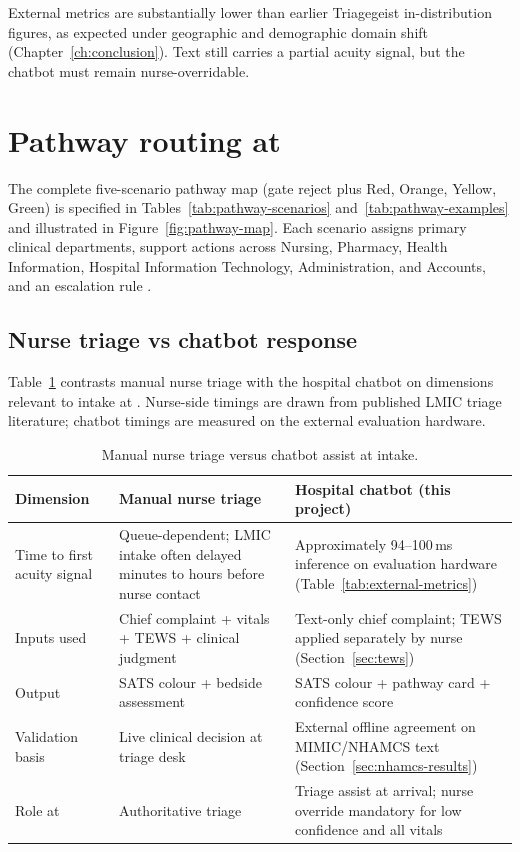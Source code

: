 \begin{remark}
External metrics are substantially lower than earlier Triagegeist in-distribution figures, as expected under geographic and demographic domain shift (Chapter~\ref{ch:conclusion}). Text still carries a partial acuity signal, but the chatbot must remain nurse-overridable.
\end{remark}

\section{Pathway routing at \examplehospital{}}
\label{sec:pathway-results}

The complete five-scenario pathway map (gate reject plus Red, Orange, Yellow, Green) is specified in Tables~\ref{tab:pathway-scenarios} and~\ref{tab:pathway-examples} and illustrated in Figure~\ref{fig:pathway-map}. Each scenario assigns primary clinical departments, support actions across Nursing, Pharmacy, Health Information, Hospital Information Technology, Administration, and Accounts, and an escalation rule \citep{satsmanual,Rominski2014}.

\subsection{Nurse triage vs chatbot response}
\label{sec:nurse-vs-chatbot}

Table~\ref{tab:nurse-vs-chatbot} contrasts manual nurse triage with the hospital chatbot on dimensions relevant to intake at \examplehospital{}. Nurse-side timings are drawn from published LMIC triage literature; chatbot timings are measured on the external evaluation hardware.

\begin{table}[H]
\centering
\small
\begin{tabular}{|p{3.2cm}|p{5.2cm}|p{5.2cm}|}
\hline
\textbf{Dimension} & \textbf{Manual nurse triage} & \textbf{Hospital chatbot (this project)} \\
\hline
Time to first acuity signal &
Queue-dependent; LMIC intake often delayed minutes to hours before nurse contact \citep{kathsats,Mitchell2023,Nurchis2025} &
Approximately 94--100\,ms inference on evaluation hardware (Table~\ref{tab:external-metrics}) \\
Inputs used &
Chief complaint + vitals + TEWS + clinical judgment \citep{satsmanual} &
Text-only chief complaint; TEWS applied separately by nurse (Section~\ref{sec:tews}) \\
Output &
SATS colour + bedside assessment &
SATS colour + pathway card + confidence score \\
Validation basis &
Live clinical decision at triage desk &
External offline agreement on MIMIC/NHAMCS text (Section~\ref{sec:nhamcs-results}) \\
Role at \examplehospital{} &
Authoritative triage &
Triage assist at arrival; nurse override mandatory for low confidence and all vitals \citep{stewart2023nlp} \\
\hline
\end{tabular}
\caption{Manual nurse triage versus chatbot assist at intake.}
\label{tab:nurse-vs-chatbot}
\end{table}

